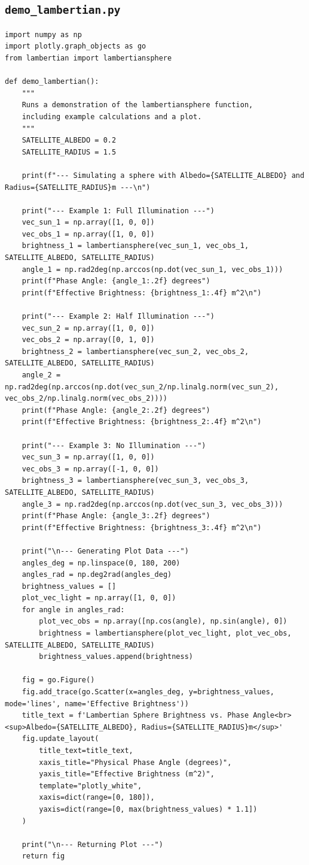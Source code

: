 \documentclass[11pt]{article}
\begin{document}
\subsection{\texttt{demo\_lambertian.py}}
\begin{Verbatim}
import numpy as np
import plotly.graph_objects as go
from lambertian import lambertiansphere

def demo_lambertian():
    """
    Runs a demonstration of the lambertiansphere function,
    including example calculations and a plot.
    """
    SATELLITE_ALBEDO = 0.2
    SATELLITE_RADIUS = 1.5

    print(f"--- Simulating a sphere with Albedo={SATELLITE_ALBEDO} and Radius={SATELLITE_RADIUS}m ---\n")

    print("--- Example 1: Full Illumination ---")
    vec_sun_1 = np.array([1, 0, 0])
    vec_obs_1 = np.array([1, 0, 0])
    brightness_1 = lambertiansphere(vec_sun_1, vec_obs_1, SATELLITE_ALBEDO, SATELLITE_RADIUS)
    angle_1 = np.rad2deg(np.arccos(np.dot(vec_sun_1, vec_obs_1)))
    print(f"Phase Angle: {angle_1:.2f} degrees")
    print(f"Effective Brightness: {brightness_1:.4f} m^2\n")

    print("--- Example 2: Half Illumination ---")
    vec_sun_2 = np.array([1, 0, 0])
    vec_obs_2 = np.array([0, 1, 0])
    brightness_2 = lambertiansphere(vec_sun_2, vec_obs_2, SATELLITE_ALBEDO, SATELLITE_RADIUS)
    angle_2 = np.rad2deg(np.arccos(np.dot(vec_sun_2/np.linalg.norm(vec_sun_2),
vec_obs_2/np.linalg.norm(vec_obs_2))))
    print(f"Phase Angle: {angle_2:.2f} degrees")
    print(f"Effective Brightness: {brightness_2:.4f} m^2\n")

    print("--- Example 3: No Illumination ---")
    vec_sun_3 = np.array([1, 0, 0])
    vec_obs_3 = np.array([-1, 0, 0])
    brightness_3 = lambertiansphere(vec_sun_3, vec_obs_3, SATELLITE_ALBEDO, SATELLITE_RADIUS)
    angle_3 = np.rad2deg(np.arccos(np.dot(vec_sun_3, vec_obs_3)))
    print(f"Phase Angle: {angle_3:.2f} degrees")
    print(f"Effective Brightness: {brightness_3:.4f} m^2\n")

    print("\n--- Generating Plot Data ---")
    angles_deg = np.linspace(0, 180, 200)
    angles_rad = np.deg2rad(angles_deg)
    brightness_values = []
    plot_vec_light = np.array([1, 0, 0])
    for angle in angles_rad:
        plot_vec_obs = np.array([np.cos(angle), np.sin(angle), 0])
        brightness = lambertiansphere(plot_vec_light, plot_vec_obs, SATELLITE_ALBEDO, SATELLITE_RADIUS)
        brightness_values.append(brightness)

    fig = go.Figure()
    fig.add_trace(go.Scatter(x=angles_deg, y=brightness_values, mode='lines', name='Effective Brightness'))
    title_text = f'Lambertian Sphere Brightness vs. Phase Angle<br><sup>Albedo={SATELLITE_ALBEDO}, Radius={SATELLITE_RADIUS}m</sup>'
    fig.update_layout(
        title_text=title_text,
        xaxis_title="Physical Phase Angle (degrees)",
        yaxis_title="Effective Brightness (m^2)",
        template="plotly_white",
        xaxis=dict(range=[0, 180]),
        yaxis=dict(range=[0, max(brightness_values) * 1.1])
    )

    print("\n--- Returning Plot ---")
    return fig
\end{Verbatim}
\end{document}
